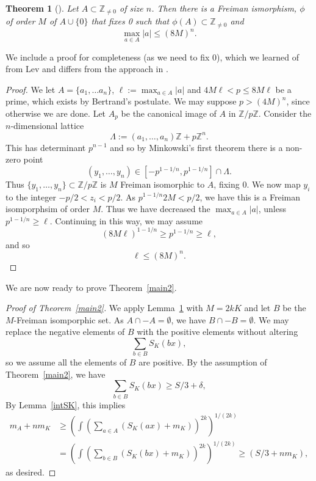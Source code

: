 \documentclass[12pt,reqno]{amsart}
\theoremstyle{dotless}
\newtheorem{thm}{Theorem}
\begin{document}
\begin{thm}[\cite{KL}]\label{KL} Let $A \subset \mathbb{Z}_{\neq 0}$ of size $n$. Then there is a Freiman ismorphism, $\phi$ of order $M$ of  $A \cup \{0\}$ that fixes 0 such that $\phi(A) \subset \mathbb{Z}_{\neq 0}$ and $$\max_{a \in A} |a| \leq (8M)^n.$$

\end{thm}
We include a proof for completeness (as we need to fix 0), which we learned of from Lev and differs from the approach in \cite{KL}.
\begin{proof} We let $A= \{a_1 , \ldots a_n\}$, $\ell := \max_{a \in A} |a|$ and $4M\ell < p \leq 8M \ell$ be a prime, which exists by Bertrand's postulate. We may suppose $p > (4M)^n$, since otherwise we are done. Let $A_p$ be the canonical image of $A$ in $\mathbb{Z}/p\mathbb{Z}$.  Consider the $n$-dimensional lattice
$$\Lambda := (a_1 , \ldots , a_n) \mathbb{Z} + p \mathbb{Z}^n.$$
This has determinant $p^{n-1}$ and so by Minkowski's first theorem there is a non-zero point
$$(y_1 , \ldots , y_n) \in [-p^{1-1/n} , p^{1-1/n}] \cap \Lambda.$$
Thus $\{y_1 , \ldots , y_n\} \subset \mathbb{Z} / p \mathbb{Z}$ is $M$ Freiman isomorphic to $A$, fixing 0. We now map $y_i$ to the integer $-p/2 < z_i < p/2$. As $p^{1-1/n} 2M < p/2$, we have this is a Freiman isomporphsim of order $M$. Thus we have decreased the $\max_{a \in A} |a|$, unless $p^{1-1/n}  \geq \ell$. Continuing in this way, we may assume $$(8M\ell)^{1-1/n} \geq p^{1-1/n}  \geq  \ell,$$
and so $$\ell \leq (8M)^{n}.$$
\end{proof}

We are now ready to prove Theorem~\ref{main2}.

\begin{proof}[Proof of Theorem~\ref{main2}]

We apply Lemma~\ref{KL} with $M=2kK$ and let $B$ be the $M$-Freiman isomporphic set. As $A \cap - A = \emptyset$, we have $B \cap -B = \emptyset$. We may replace the negative elements of $B$ with the positive elements without altering 
$$\sum_{b \in B} S_K(bx),$$
so we assume all the elements of $B$ are positive. By the assumption of Theorem~\ref{main2}, we have 
$$\sum_{b \in B} S_K(bx) \geq S/3 + \delta,$$
By Lemma~\ref{intSK}, this implies
 \begin{align*} m_A + nm_K& \geq \left( \int \left( \sum_{a\in A} (S_K(ax) + m_K)\right)^{2k} \right)^{1/(2k)} \\  & = \left( \int \left( \sum_{b\in B} (S_K(bx) + m_K)\right)^{2k} \right)^{1/(2k)} 
  \geq (S/3+nm_K ),\end{align*}
 as desired. 
\end{proof}
\end{document}
